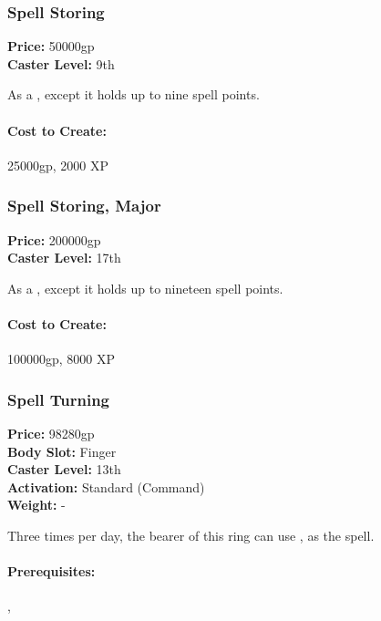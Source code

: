 \subsubsection{Spell Storing}
\label{Item:SpellStoring}
   \textbf{Price:} 50000gp
\\ \textbf{Caster Level:} 9th

As a , except it holds up to nine spell points.

\paragraph{Cost to Create:} 25000gp, 2000 XP
\subsubsection{Spell Storing, Major}
\label{Item:SpellStoringMajor}
   \textbf{Price:} 200000gp
\\ \textbf{Caster Level:} 17th

As a , except it holds up to nineteen spell points.

\paragraph{Cost to Create:} 100000gp, 8000 XP
\subsubsection{Spell Turning}
\label{Item:SpellTurning}
   \textbf{Price:} 98280gp
\\ \textbf{Body Slot:} Finger
\\ \textbf{Caster Level:} 13th
\\ \textbf{Activation:} Standard (Command)
\\ \textbf{Weight:} -

Three times per day, the bearer of this ring can use , as the spell.


\paragraph{Prerequisites:} , 

